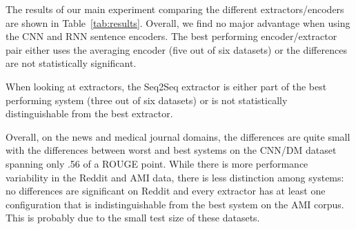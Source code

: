 

The results of our main experiment comparing 
the different extractors/encoders are shown in 
Table~\ref{tab:results}.
Overall, we find no major advantage when using the CNN and RNN sentence
encoders. The best performing encoder/extractor pair either 
uses the averaging 
encoder (five out of six datasets) or the differences 
are not statistically significant. %



When looking at extractors, the Seq2Seq extractor is either part of 
the best performing system (three out of six datasets) or is not 
statistically distinguishable from the best extractor. 

Overall, on the news and medical journal domains, the differences are 
quite small with the 
differences between worst and best systems on the CNN/DM dataset 
spanning only .56 of a ROUGE point. While there is more performance variability
 in the Reddit and AMI data, there is less distinction among systems: 
 no differences are significant on Reddit
and every extractor has at least one configuration that is indistinguishable
from the best system on the AMI corpus. This is probably due to the small test
size of these datasets.





